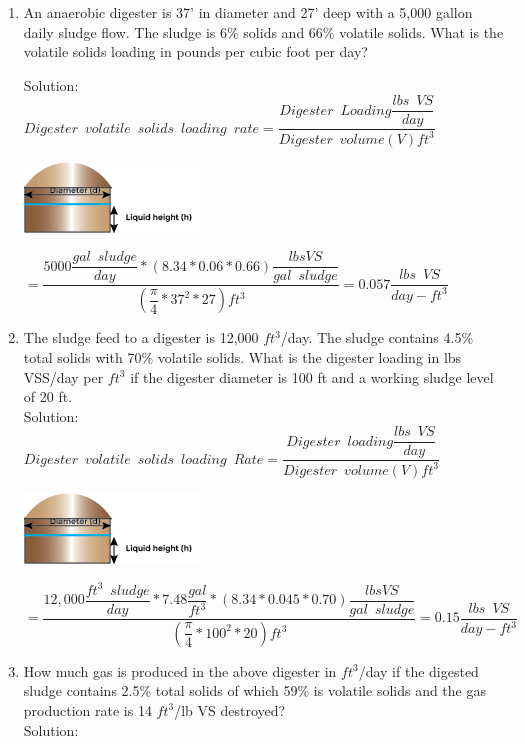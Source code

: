 \documentclass{article}
\begin{document}
\begin{enumerate}
\item An anaerobic digester is 37’ in diameter and 27’ deep with a 5,000 gallon daily sludge flow. The sludge is 6\% solids and 66\% volatile solids.  What is the volatile solids loading in pounds per cubic foot per day?
	
	
Solution:\\
{
$
	Digester \enspace volatile \enspace solids 			\enspace loading \enspace rate = 					\dfrac
	{
	Digester \enspace Loading 
		\dfrac
		{
		lbs \enspace VS
		}
		{
		day
		}
	}
	{
	Digester \enspace volume (V)ft^3
	}
$
}\\
\begin{center}
\includegraphics[scale=1]{DigesterWOCDimensions_1}
\end{center}

{
$=\dfrac
	{
		5000
		\dfrac
			{gal \enspace sludge}
			{day}
		*(8.34*0.06*0.66) 
		\dfrac
			{lbs VS}
			{gal \enspace  sludge}
	}
	{
		(\dfrac
			{\pi}
			{4}*37^2*27)ft^3
	}
=\boxed
	{
		0.057 \dfrac
			{lbs \enspace VS}
			{day-ft^3}
	}
$}

\item The sludge feed to a digester is 12,000 $ft^3$/day.  The sludge contains 4.5\% total solids with 70\% volatile solids.  What is the digester loading in lbs VSS/day per $ft^3$ if the digester diameter is 100 ft and a working sludge level of 20 ft.\\
	
Solution:\\
{
$
	Digester \enspace volatile \enspace solids 			\enspace loading \enspace Rate = 					\dfrac
	{
	Digester \enspace loading 
		\dfrac
		{
		lbs \enspace VS
		}
		{
		day
		}
	}
	{
	Digester \enspace volume (V)ft^3
	}
$
}\\

\begin{center}
\includegraphics[scale=1]{DigesterWOCDimensions_1}
\end{center}

{
$=\dfrac
	{
		12,000
		\dfrac
			{
			ft^3 \enspace sludge
			}
			{
			day
			}
		*7.48 \dfrac
				{
				gal
				}
				{
				ft^3
				}	
		*(8.34*0.045*0.70) 
		\dfrac
			{lbs VS}
			{gal \enspace  sludge}
	}
	{
		(	\dfrac
			{
			\pi
			}
			{
			4
			}
			*100^2*20
		)
		ft^3
	}
=\boxed
	{
		0.15 \dfrac
			{
			lbs \enspace VS
			}
			{
			day-ft^3
			}
	}
$}\\
\item How much gas is produced in the above digester in $ft^3$/day if the digested sludge contains 2.5\% total solids of which 59\% is volatile solids and the gas production rate is 14 $ft^3$/lb VS destroyed?\\
Solution:\\


\end{enumerate}
\end{document}
